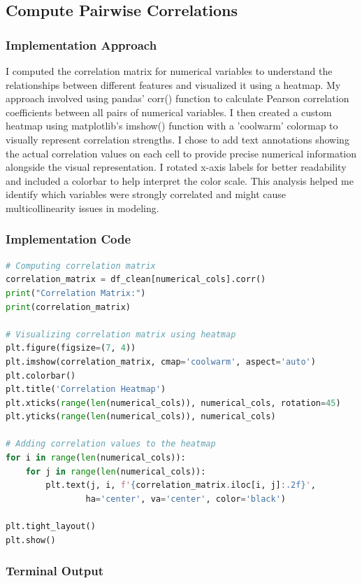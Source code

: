 \documentclass[12pt,a4paper]{article}
\begin{document}
\subsection{Compute Pairwise Correlations}

\subsubsection{Implementation Approach}
I computed the correlation matrix for numerical variables to understand the relationships between different features and visualized it using a heatmap. My approach involved using pandas' corr() function to calculate Pearson correlation coefficients between all pairs of numerical variables. I then created a custom heatmap using matplotlib's imshow() function with a 'coolwarm' colormap to visually represent correlation strengths. I chose to add text annotations showing the actual correlation values on each cell to provide precise numerical information alongside the visual representation. I rotated x-axis labels for better readability and included a colorbar to help interpret the color scale. This analysis helped me identify which variables were strongly correlated and might cause multicollinearity issues in modeling.

\subsubsection{Implementation Code}
\begin{lstlisting}[language=Python, caption=Compute Pairwise Correlations]
# Computing correlation matrix
correlation_matrix = df_clean[numerical_cols].corr()
print("Correlation Matrix:")
print(correlation_matrix)

# Visualizing correlation matrix using heatmap
plt.figure(figsize=(7, 4))
plt.imshow(correlation_matrix, cmap='coolwarm', aspect='auto')
plt.colorbar()
plt.title('Correlation Heatmap')
plt.xticks(range(len(numerical_cols)), numerical_cols, rotation=45)
plt.yticks(range(len(numerical_cols)), numerical_cols)

# Adding correlation values to the heatmap
for i in range(len(numerical_cols)):
    for j in range(len(numerical_cols)):
        plt.text(j, i, f'{correlation_matrix.iloc[i, j]:.2f}', 
                ha='center', va='center', color='black')

plt.tight_layout()
plt.show()
\end{lstlisting}

\subsubsection{Terminal Output}
\end{document}

